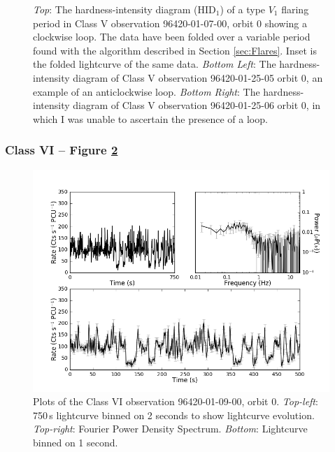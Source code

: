 \begin{figure}
    \captionsetup{singlelinecheck=off}
    \caption[The hardness-intensity diagram of a type $V_1$ flaring period in Class V observation 96420-01-07-00 showing a clockwise loop.]{\textit{Top}: The hardness-intensity diagram (HID$_1$) of a type $V_1$ flaring period in Class V observation 96420-01-07-00, orbit 0 showing a clockwise loop.  The data have been folded over a variable period found with the algorithm described in Section \ref{sec:Flares}.  Inset is the folded lightcurve of the same data. \textit{Bottom Left}: The hardness-intensity diagram of Class V observation 96420-01-25-05 orbit 0, an example of an anticlockwise loop.  \textit{Bottom Right}: The hardness-intensity diagram of Class V observation 96420-01-25-06 orbit 0, in which I was unable to ascertain the presence of a loop.}
   \label{fig:LoopV}
\end{figure}

\subsubsection{Class VI -- Figure \ref{fig:Lmulti}}

\begin{figure}
    \includegraphics[width=0.8\columnwidth, trim = 0.6cm 0 3.9cm 0]{images/Lmulti.png}
    \captionsetup{singlelinecheck=off}
    \caption[Characteristic lightcurves and a power spectrum of Type VI variability.]{Plots of the Class VI observation 96420-01-09-00, orbit 0.  \textit{Top-left}: 750\,s lightcurve binned on 2 seconds to show lightcurve evolution.  \textit{Top-right}: Fourier Power Density Spectrum.  \textit{Bottom}: Lightcurve binned on 1 second.}
   \label{fig:Lmulti}
\end{figure}

